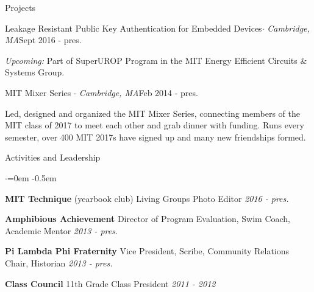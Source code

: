 \documentclass{resume} %
\begin{document}

\begin{rSection}{Projects}

\begin{rSubsection}{Leakage Resistant Public Key Authentication for Embedded Devices{\normalfont $\cdot$ \em Cambridge, MA}}{Sept 2016 - pres.}{}{}
\item {\em Upcoming:} Part of SuperUROP Program in the MIT Energy Efficient Circuits \& Systems Group.
\end{rSubsection}


\begin{rSubsection}{MIT Mixer Series {\normalfont \em $\cdot$ Cambridge, MA}}{Feb 2014 - pres.}{}{}
\item Led, designed and organized the MIT Mixer Series, connecting members of the MIT class of 2017 to meet each other and grab dinner with funding. Runs every semester, over 400 MIT 2017s have signed up and many new friendships formed.
\end{rSubsection}

\end{rSection}


\begin{rSection}{Activities and Leadership}

\begin{list}{$\cdot$}{\leftmargin=0em} %
\itemsep -0.5em  %
\item {\bf MIT Technique} (yearbook club) Living Groups Photo Editor \hfill {\em  2016 - pres.}
\item {\bf Amphibious Achievement} Director of Program Evaluation, Swim Coach, Academic Mentor \hfill {\em 2013 - pres.} 
\item {\bf Pi Lambda Phi Fraternity} Vice President, Scribe, Community Relations Chair, Historian \hfill {\em 2013 - pres.}
\item {\bf Class Council} 11th Grade Class President \hfill {\em 2011 - 2012}
  
\end{list}

\end{rSection}
\end{document}
